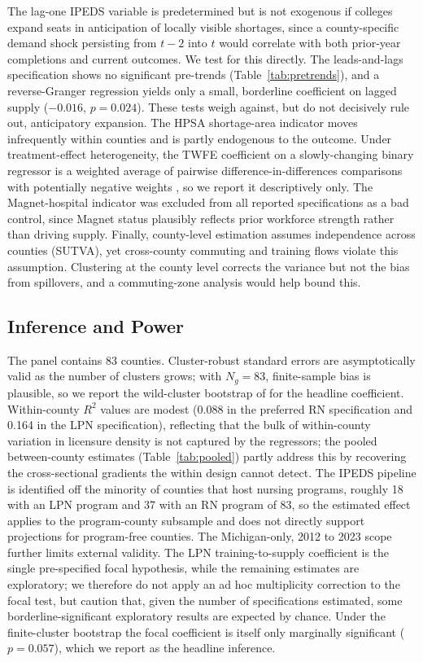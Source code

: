 \documentclass[12pt]{article}
\begin{document}
The lag-one IPEDS variable is predetermined but is not exogenous if
colleges expand seats in anticipation of locally visible shortages, since
a county-specific demand shock persisting from $t-2$ into $t$ would
correlate with both prior-year completions and current outcomes. We test
for this directly. The leads-and-lags specification shows no significant
pre-trends (Table~\ref{tab:pretrends}), and a reverse-Granger regression
yields only a small, borderline coefficient on lagged supply ($-0.016$,
$p = 0.024$). These tests weigh against, but do not decisively rule out,
anticipatory expansion. The HPSA shortage-area indicator moves
infrequently within counties and is partly endogenous to the outcome.
Under treatment-effect heterogeneity, the TWFE coefficient on a
slowly-changing binary regressor is a weighted average of pairwise
difference-in-differences comparisons with potentially negative weights
\citep{goodman2021difference, de2020two}, so we report it descriptively
only. The Magnet-hospital indicator was excluded from all reported
specifications as a bad control, since Magnet status plausibly reflects
prior workforce strength rather than driving supply. Finally, county-level
estimation assumes independence across counties (SUTVA), yet cross-county
commuting and training flows violate this assumption. Clustering at the
county level corrects the variance but not the bias from spillovers, and a
commuting-zone analysis would help bound this.

\subsection{Inference and Power}

The panel contains 83 counties. Cluster-robust standard errors are
asymptotically valid as the number of clusters grows; with $N_g = 83$,
finite-sample bias is plausible, so we report the wild-cluster bootstrap of
\citet{cameron2008bootstrap} for the headline coefficient. Within-county
$R^2$ values are modest (0.088 in the preferred RN specification and 0.164
in the LPN specification), reflecting that the bulk of within-county
variation in licensure density is not captured by the regressors; the
pooled between-county estimates (Table~\ref{tab:pooled}) partly address
this by recovering the cross-sectional gradients the within design cannot
detect. The IPEDS pipeline is identified off the minority of counties that
host nursing programs, roughly 18 with an LPN program and 37 with an RN
program of 83, so the estimated effect applies to the program-county
subsample and does not directly support projections for program-free
counties. The Michigan-only, 2012 to 2023 scope further limits external
validity. The LPN training-to-supply coefficient is the single
pre-specified focal hypothesis, while the remaining estimates are
exploratory; we therefore do not apply an ad hoc multiplicity correction to
the focal test, but caution that, given the number of specifications
estimated, some borderline-significant exploratory results are expected by
chance. Under the finite-cluster bootstrap the focal coefficient is itself
only marginally significant ($p = 0.057$), which we report as the headline
inference.
\end{document}
